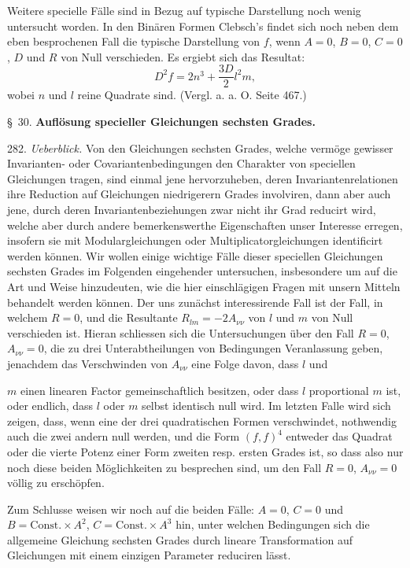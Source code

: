 \documentclass[11pt]{article}
\providecommand{\weberpage}[1]{}
\begin{document}
Weitere specielle Fälle sind in Bezug auf typische Darstellung noch wenig untersucht worden. In den \glqq Binären Formen\grqq{} Clebsch's findet sich noch neben dem eben besprochenen Fall die typische Darstellung von $f$, wenn $A=0$, $B=0$, $C=0$, $D$ und $R$ von Null verschieden. Es ergiebt sich das Resultat:
\[
D^2f=2n^3+\frac{3D}{2}l^2m,
\]
wobei $n$ und $l$ reine Quadrate sind. (Vergl. a. a. O. Seite 467.)

\begin{center}
\S\ 30. \textbf{Auflösung specieller Gleichungen sechsten Grades.}
\end{center}

282. \textit{Ueberblick.} Von den Gleichungen sechsten Grades, welche vermöge gewisser Invarianten- oder Covariantenbedingungen den Charakter von speciellen Gleichungen tragen, sind einmal jene hervorzuheben, deren Invariantenrelationen ihre Reduction auf Gleichungen niedrigerern Grades involviren, dann aber auch jene, durch deren Invariantenbeziehungen zwar nicht ihr Grad reducirt wird, welche aber durch andere bemerkenswerthe Eigenschaften unser Interesse erregen, insofern sie mit Modulargleichungen oder Multiplicatorgleichungen identificirt werden können. Wir wollen einige wichtige Fälle dieser speciellen Gleichungen sechsten Grades im Folgenden eingehender untersuchen, insbesondere um auf die Art und Weise hinzudeuten, wie die hier einschlägigen Fragen mit unsern Mitteln behandelt werden können. Der uns zunächst interessirende Fall ist der Fall, in welchem $R=0$, und die Resultante $R_{lm}=-2A_{\nu\nu}$ von $l$ und $m$ von Null verschieden ist. Hieran schliessen sich die Untersuchungen über den Fall $R=0$, $A_{\nu\nu}=0$, die zu drei Unterabtheilungen von Bedingungen Veranlassung geben, jenachdem das Verschwinden von $A_{\nu\nu}$ eine Folge davon, dass $l$ und


\weberpage{307}
$m$ einen linearen Factor gemeinschaftlich besitzen, oder dass $l$ proportional $m$ ist, oder endlich, dass $l$ oder $m$ selbst identisch null wird. Im letzten Falle wird sich zeigen, dass, wenn eine der drei quadratischen Formen verschwindet, nothwendig auch die zwei andern null werden, und die Form $(f,f)^4$ entweder das Quadrat oder die vierte Potenz einer Form zweiten resp. ersten Grades ist, so dass also nur noch diese beiden Möglichkeiten zu besprechen sind, um den Fall $R=0$, $A_{\nu\nu}=0$ völlig zu erschöpfen.

Zum Schlusse weisen wir noch auf die beiden Fälle: $A=0$, $C=0$ und $B=\text{Const.}\times A^2$, $C=\text{Const.}\times A^3$ hin, unter welchen Bedingungen sich die allgemeine Gleichung sechsten Grades durch lineare Transformation auf Gleichungen mit einem einzigen Parameter reduciren lässt.
\end{document}
